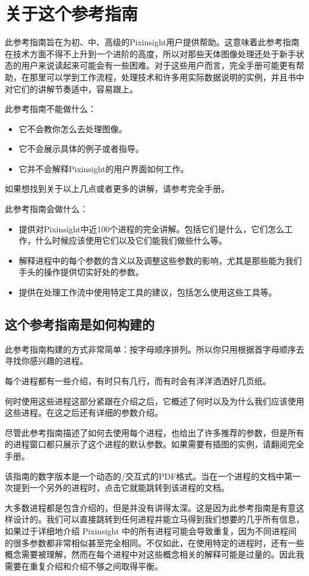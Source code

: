 \chapter{关于这个参考指南}

此参考指南旨在为初、中、高级的Pixinsight用户提供帮助。这意味着此参考指南在技术方面不得不上升到一个进阶的高度，所以对那些天体图像处理还处于新手状态的用户来说读起来可能会有一些困难。对于这些用户而言，完全手册可能更有帮助，在那里可以学到工作流程，处理技术和许多用实际数据说明的实例，并且书中对它们的讲解节奏适中，容易跟上。

此参考指南不能做什么：

\begin{itemize}
  \item 它不会教你怎么去处理图像。
  \item 它不会展示具体的例子或者指导。
  \item 它并不会解释Pixinsight的用户界面如何工作。
\end{itemize}

如果想找到关于以上几点或者更多的讲解，请参考完全手册。

此参考指南会做什么：

\begin{itemize}
  \item 提供对Pixinsight中近100个进程的完全讲解。包括它们是什么，它们怎么工作，什么时候应该使用它们以及它们能我们做些什么等。
  \item 解释进程中的每个参数的含义以及调整这些参数的影响，尤其是那些能为我们手头的操作提供切实好处的参数。
  \item 提供在处理工作流中使用特定工具的建议，包括怎么使用这些工具等。
\end{itemize}


\section{这个参考指南是如何构建的}

此参考指南构建的方式非常简单：按字母顺序排列。所以你只用根据首字母顺序去寻找你感兴趣的进程。

每个进程都有一些介绍，有时只有几行，而有时会有洋洋洒洒好几页纸。

何时使用这些进程这部分紧跟在介绍之后，它概述了何时以及为什么我们应该使用这些进程。在这之后还有详细的参数介绍。

尽管此参考指南描述了如何去使用每个进程，也给出了许多推荐的参数，但是所有的进程窗口都只展示了这个进程的默认参数。如果需要有插图的实例，请翻阅完全手册。

该指南的数字版本是一个动态的/交互式的PDF格式。当在一个进程的文档中第一次提到一个另外的进程时，点击它就能跳转到该进程的文档。

大多数进程都是包含介绍的，但是并没有讲得太深。这是因为此参考指南是有意这样设计的。我们可以直接跳转到任何进程并能立马得到我们想要的几乎所有信息，如果过于详细地介绍 Pixinsight 中的所有进程可能会导致重复，因为不同进程间的很多参数都非常相似甚至完全相同。不仅如此，在使用特定的进程时，还有一些概念需要被理解，然而在每个进程中对这些概念相关的解释可能是过量的。因此我需要在重复介绍和介绍不够之间取得平衡。
